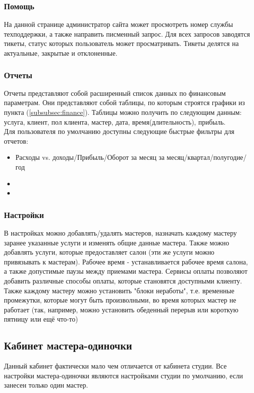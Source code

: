 \documentclass[DIV=calc, paper=a4, fontsize=11pt]{scrartcl} %
\begin{document}
\subsubsection{Помощь}
На данной странице администратор сайта может просмотреть номер службы техподдержки, а также направить писменный запрос. Для всех запросов заводятся тикеты, статус которых пользователь может просматривать. Тикеты делятся на актуальные, закрытые и отклоненные.

\subsubsection{Отчеты}
Отчеты представляют собой расширенный список данных по финансовым параметрам. Они представляют собой таблицы, по которым строятся графики из пункта (\ref{subsubsec:finance}). Таблицы можно получить по следующим данным: услуга, клиент, пол клиента, мастер, дата, время(длительность), прибыль. 
\\[0.5cm]
Для пользователя по умолчанию доступны следующие быстрые фильтры для отчетов: 
    \begin{itemize}
        \item Расходы vs. доходы/Прибыль/Оборот за месяц за месяц/квартал/полугодие/год
        \item 
        \item 
    \end{itemize}


\subsubsection{Настройки}
В настройках можно добавлять/удалять мастеров, назначать каждому мастеру заранее указанные услуги и изменять общие данные мастера.
Также можно добавлять услуги, которые предоставляет салон (эти же услуги можно привязывать к мастерам).
Рабочее время - устанавливается рабочее время салона, а также допустимые паузы между приемами мастера.
Сервисы оплаты позволяют добавить различные способы оплаты, которые становятся доступными клиенту. Также каждому мастеру можно установить "блоки неработы", т.е. временные промежутки, которые могут быть произволными, во время которых мастер не работает (так, например, можно установить обеденный перерыв или короткую пятницу или ещё что-то)


\subsection{Кабинет мастера-одиночки}
Данный кабинет фактически мало чем отличается от кабинета студии. Все настройки мастера-одиночки являются настройками студии по умолчанию, если занесен только один мастер.
\end{document}
